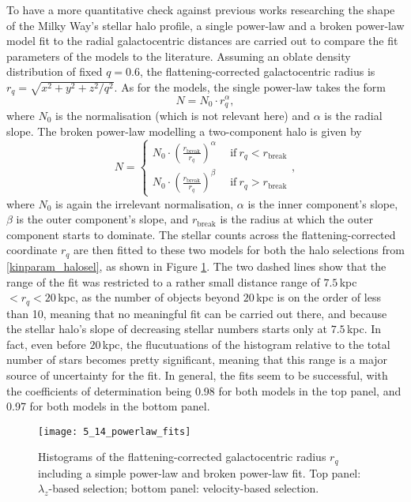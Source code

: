 \documentclass[a4paper,11pt]{article}
\begin{document}
%
To have a more quantitative check against previous works researching the shape of the Milky Way's stellar halo profile, a single power-law and a broken power-law model fit to the radial galactocentric distances are carried out to compare the fit parameters of the models to the literature. Assuming an oblate density distribution of fixed $q=0.6$, the flattening-corrected galactocentric radius is $r_q=\sqrt{x^2+y^2+z^2/q^2}$. As for the models, the single power-law takes the form
%
\begin{equation}
 N=N_0\cdot r_q^\alpha,
\end{equation}
%
where $N_0$ is the normalisation (which is not relevant here) and $\alpha$ is the radial slope. The broken power-law modelling a two-component halo is given by
%
\begin{equation}
 N=
\begin{cases}
 N_0\cdot\left(\frac{r_\mathrm{break}}{r_q}\right)^\alpha\ \ & \text{if}\ r_q<r_\mathrm{break}\\
 N_0\cdot\left(\frac{r_\mathrm{break}}{r_q}\right)^\beta\ \ & \text{if}\ r_q>r_\mathrm{break}
\end{cases}
 ,
\end{equation}
%
where $N_0$ is again the irrelevant normalisation, $\alpha$ is the inner component's slope, $\beta$ is the outer component's slope, and $r_\mathrm{break}$ is the radius at which the outer component starts to dominate. The stellar counts across the flattening-corrected coordinate $r_q$ are then fitted to these two models for both the halo selections from \ref{kinparam_halosel}, as shown in Figure \ref{fig:powerlaw_fits}. The two dashed lines show that the range of the fit was restricted to a rather small distance range of $7.5$\,kpc $<r_q<20$\,kpc, as the number of objects beyond $20$\,kpc is on the order of less than 10, meaning that no meaningful fit can be carried out there, and because the stellar halo's slope of decreasing stellar numbers starts only at $7.5$\,kpc. In fact, even before $20$\,kpc, the flucutuations of the histogram relative to the total number of stars becomes pretty significant, meaning that this range is a major source of uncertainty for the fit. In general, the fits seem to be successful, with the coefficients of determination being 0.98 for both models in the top panel, and 0.97 for both models in the bottom panel.
%
\begin{figure}[ht]
 \centering
 \texttt{[image: 5\_14\_powerlaw\_fits]}
 \caption[Power-law fits to the galactocentric distance distribution]{Histograms of the flattening-corrected galactocentric radius $r_q$ including a simple power-law and broken power-law fit. Top panel: $\lambda_z$-based selection; bottom panel: velocity-based selection.}
 \label{fig:powerlaw_fits}
\end{figure}\\ \\
\end{document}
